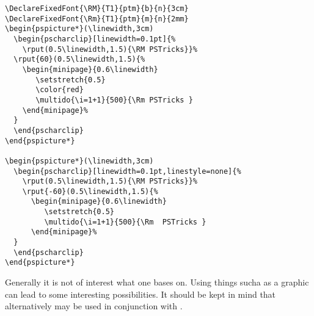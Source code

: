 \documentclass[11pt,english,BCOR10mm,DIV12,bibliography=totoc,parskip=false,smallheadings
    headexclude,footexclude,oneside]{pst-doc}
\begin{document}
\begin{lstlisting}
\DeclareFixedFont{\RM}{T1}{ptm}{b}{n}{3cm}
\DeclareFixedFont{\Rm}{T1}{ptm}{m}{n}{2mm}
\begin{pspicture*}(\linewidth,3cm)
  \begin{pscharclip}[linewidth=0.1pt]{%
    \rput(0.5\linewidth,1.5){\RM PSTricks}}%
  \rput{60}(0.5\linewidth,1.5){%
    \begin{minipage}{0.6\linewidth}
       \setstretch{0.5}
       \color{red}
       \multido{\i=1+1}{500}{\Rm PSTricks }
    \end{minipage}%
  }
  \end{pscharclip}
\end{pspicture*}

\begin{pspicture*}(\linewidth,3cm)
  \begin{pscharclip}[linewidth=0.1pt,linestyle=none]{%
    \rput(0.5\linewidth,1.5){\RM PSTricks}}%
    \rput{-60}(0.5\linewidth,1.5){%
      \begin{minipage}{0.6\linewidth}
         \setstretch{0.5}
         \multido{\i=1+1}{500}{\Rm  PSTricks }
      \end{minipage}%
  }
  \end{pscharclip}
\end{pspicture*}
\end{lstlisting}


\medskip
Generally it is not of interest what one bases  on.  
Using things sucha as a graphic can lead to some interesting possibilities. 
It should be kept in mind that alternatively  may be
used in conjunction with .


\nocite{*}
\bgroup
\raggedright


\egroup

\printindex
\end{document}
